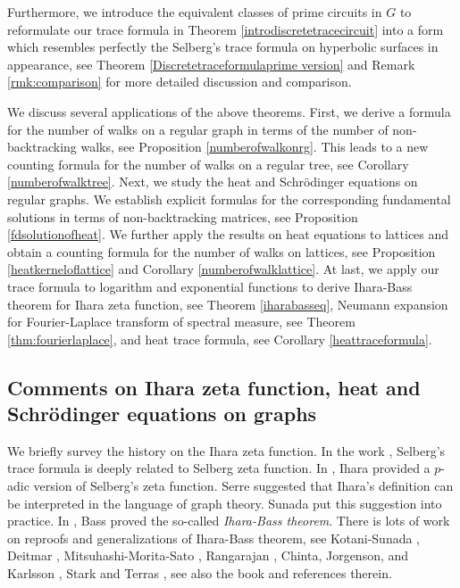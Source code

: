 \documentclass{article}
\begin{document}
Furthermore, we introduce the equivalent classes of prime circuits in $G$ to reformulate our trace formula in Theorem \ref{introdiscretetracecircuit} into a form which resembles perfectly the Selberg's trace formula on hyperbolic surfaces in appearance, see Theorem \ref{Discretetraceformulaprime version} and Remark \ref{rmk:comparison} for more detailed discussion and comparison. 

We discuss several applications of the above theorems. First, we derive a formula for the number of walks on a regular graph in terms of the number of non-backtracking walks, see Proposition \ref{numberofwalkonrg}. This leads to a new counting formula for the number of walks on a regular tree, see Corollary \ref{numberofwalktree}. Next, we study the heat and Schr\"odinger equations on regular graphs. We establish explicit formulas for the corresponding fundamental solutions in terms of non-backtracking matrices, see Proposition \ref{fdsolutionofheat}. We further apply the results on heat equations to lattices and obtain a counting formula for the number of walks on lattices, see Proposition \ref{heatkerneloflattice} and Corollary \ref{numberofwalklattice}. At last, we apply our trace formula to logarithm and exponential functions to derive Ihara-Bass theorem for Ihara zeta function,  see Theorem \ref{iharabasseq}, Neumann expansion for Fourier-Laplace transform of spectral measure, see Theorem \ref{thm:fourierlaplace}, and heat trace formula, see Corollary \ref{heattraceformula}.

\subsection{Comments on Ihara zeta function, heat and Schr\"odinger equations on graphs}
We briefly survey the history on the Ihara zeta function. In the work \cite{Sel56}, 
Selberg's trace formula is deeply related to Selberg zeta function.  In \cite{Ihara66}, Ihara provided a $p$-adic version of Selberg's zeta function. Serre \cite{Ser02} suggested that Ihara's definition can be interpreted in the language of graph theory. Sunada \cite{ST06} put this suggestion into practice. In \cite{BH92}, Bass proved the so-called \emph{Ihara-Bass theorem}. There is lots of work on reproofs and generalizations of Ihara-Bass theorem, see Kotani-Sunada \cite{KS00}, Deitmar \cite{Dei15}, Mitsuhashi-Morita-Sato \cite{KMMS19}, Rangarajan \cite{RB18}, Chinta, Jorgenson, and Karlsson \cite{CJK15}, Stark and Terras \cite{ST96, ST00}, see also the book \cite{HFGO12} and references therein.
\end{document}
